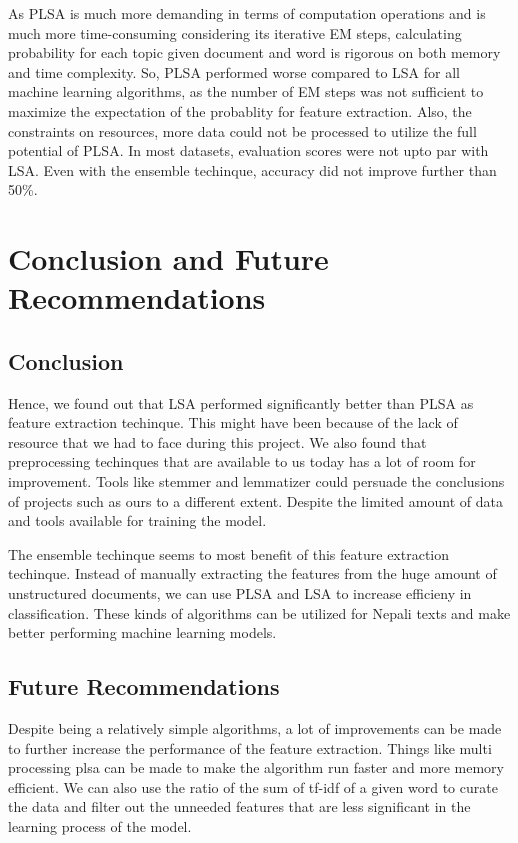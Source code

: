 \documentclass[12pt]{report}
\begin{document}
             As PLSA is much more demanding in terms of computation operations and is much more time-consuming considering its iterative EM steps, calculating probability for each topic given document and word
             is rigorous on both memory and time complexity. So, PLSA performed worse compared to LSA for all machine learning algorithms, as the number of EM steps was not sufficient to maximize the expectation of the probablity for feature extraction.
             Also, the constraints on resources, more data could not be processed to utilize the full potential of PLSA. In most datasets, evaluation scores were not upto par with LSA.
             Even with the ensemble techinque, accuracy did not improve further than 50\%.



             \chapter{Conclusion and Future Recommendations}
             \section{Conclusion}
             Hence, we found out that LSA performed significantly better than PLSA as feature extraction techinque. This might have been because of the lack of resource that we had to face
             during this project.
             We also found that preprocessing techinques that are available to us today has a lot of room for improvement. Tools like stemmer and lemmatizer could
             persuade the conclusions of projects such as ours to a different extent. Despite the limited amount of data and tools available for training the model.

             The ensemble techinque seems to most benefit of this feature extraction techinque. Instead of manually extracting the features from the huge amount of unstructured
             documents, we can use PLSA and LSA to increase efficieny in classification. These kinds of algorithms can be utilized for Nepali texts
             and make better performing machine learning models.

             \section{Future Recommendations}

             Despite being a relatively simple algorithms, a lot of improvements can be made to further increase the performance of the feature extraction.
             Things like multi processing plsa can be made to make the algorithm run faster and more memory efficient.
             We can also use the ratio of the sum of tf-idf of a given word to curate the data and filter out the unneeded features that are less significant
             in the learning process of the model.
\end{document}
